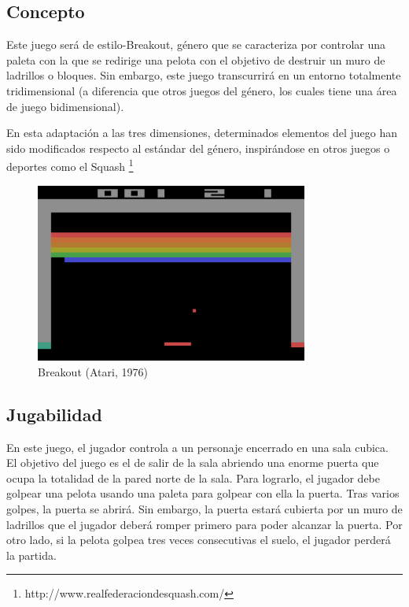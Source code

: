 \subsection{Concepto}
Este juego será de estilo-Breakout, género que se caracteriza por controlar una paleta con la que se redirige una pelota con el objetivo de destruir un muro de ladrillos o bloques. Sin embargo, este juego transcurrirá en un entorno totalmente tridimensional (a diferencia que otros juegos del género, los cuales tiene una área de juego bidimensional). 

En esta adaptación a las tres dimensiones, determinados elementos del juego han sido modificados respecto al estándar del género, inspirándose en otros juegos o deportes como el Squash \footnote{http://www.realfederaciondesquash.com/}

\begin{figure}[h]
	\includegraphics[width=0.8\textwidth]{images/intro/design/breakout}
	\centering
	\caption{Breakout (Atari, 1976)}
\end{figure}

\subsection{Jugabilidad}
En este juego, el jugador controla a un personaje encerrado en una sala cubica. El objetivo del juego es el de salir de la sala abriendo una enorme puerta que ocupa la totalidad de la pared norte de la sala. Para lograrlo, el jugador debe golpear una pelota usando una paleta para golpear con ella la puerta. Tras varios golpes, la puerta se abrirá. Sin embargo, la puerta estará cubierta por un muro de ladrillos que el jugador deberá romper primero para poder alcanzar la puerta. Por otro lado, si la pelota golpea tres veces consecutivas el suelo, el jugador perderá la partida.

